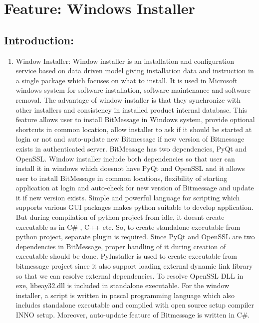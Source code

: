 \documentclass[12pt]{article}
\begin{document}


\section{Feature: Windows Installer}
\subsection {Introduction:}
\begin{enumerate}

\item Window Installer: 
Window installer is an installation and configuration service based on data driven model giving installation data and instruction in a single package which focuses on what to install. It is used in Microsoft windows system for software installation, software maintenance and software removal. The advantage of window installer is that they synchronize with other installers and consistency in installed product internal database. This feature allows user to install BitMessage in Windows system, provide optional shortcuts in common location, allow installer to ask if it should be started at login or not and auto-update new Bitmessage if new version of Bitmessage exists in authenticated server. BitMessage has two dependencies, PyQt and OpenSSL. Window installer include both dependencies so that user can install it in windows which doesnot have PyQt and OpenSSL and it allows user to install BitMessage in common locations, flexibility of starting application at login and auto-check for new version of Bitmessage and update it if new version exists. Simple and powerful language for scripting which supports various GUI packages makes python suitable to develop application. But during compilation of python project from idle, it doesnt create executable as in C\# , C++ etc. So, to create standalone executable from python project, separate plugin is required. Since PyQt and OpenSSL are two dependencies in BitMessage, proper handling of it during creation of executable should be done. PyInstaller is used to create executable from bitmessage project since it also support loading external dynamic link library so that we can resolve external dependencies.
To resolve OpenSSL DLL in exe, libeay32.dll is included in standalone executable. For the window installer, a script is written in pascal programming language which also includes standalone executable and compiled with open source setup compiler INNO setup. Moreover, auto-update feature of Bitmessage is written in C\#. 

\end{enumerate}
\end{document}
